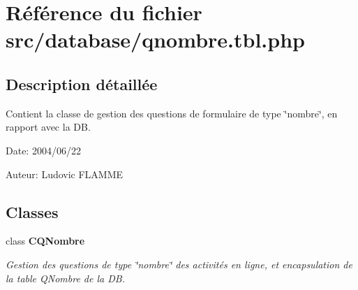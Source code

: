 \section{Référence du fichier src/database/qnombre.tbl.php}
\label{qnombre_8tbl_8php}


\subsection{Description détaillée}
Contient la classe de gestion des questions de formulaire de type \char`\"{}nombre\char`\"{}, en rapport avec la DB. 

\begin{Desc}
\item[Date:]2004/06/22\end{Desc}
\begin{Desc}
\item[Auteur:]Ludovic FLAMME \end{Desc}


\subsection*{Classes}
\begin{CompactItemize}
\item 
class {\bf CQNombre}
\begin{CompactList}\small\item\em Gestion des questions de type \char`\"{}nombre\char`\"{} des activités en ligne, et encapsulation de la table QNombre de la DB. \item\end{CompactList}\end{CompactItemize}
